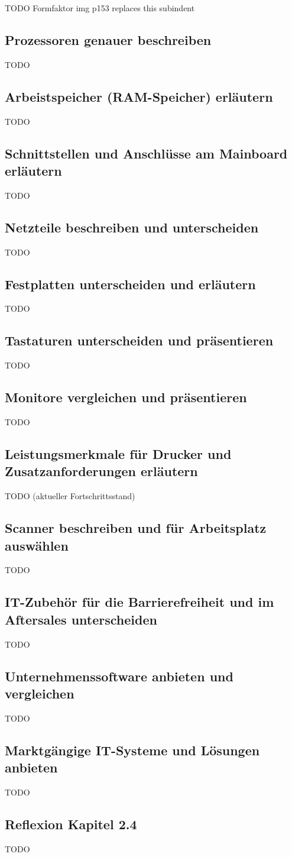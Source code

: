     \begin{subindent}
        TODO Formfaktor img p153 replaces this subindent
    \end{subindent}
    
\subsection{Prozessoren genauer beschreiben}
    TODO
\subsection{Arbeistspeicher (RAM-Speicher) erläutern}
    TODO
\subsection{Schnittstellen und Anschlüsse am Mainboard erläutern}
    TODO
\subsection{Netzteile beschreiben und unterscheiden}
    TODO
\subsection{Festplatten unterscheiden und erläutern}
    TODO
\subsection{Tastaturen unterscheiden und präsentieren}
    TODO
\subsection{Monitore vergleichen und präsentieren}
    TODO
\subsection{Leistungsmerkmale für Drucker und Zusatzanforderungen erläutern}
    TODO (aktueller Fortschrittsstand)
\subsection{Scanner beschreiben und für Arbeitsplatz auswählen}
    TODO
\subsection{IT-Zubehör für die Barrierefreiheit und im Aftersales unterscheiden}
    TODO
\subsection{Unternehmenssoftware anbieten und vergleichen}
    TODO
\subsection{Marktgängige IT-Systeme und Lösungen anbieten}
    TODO
\subsection*{Reflexion Kapitel 2.4}
    \begin{refindent}
        TODO
    \end{refindent}